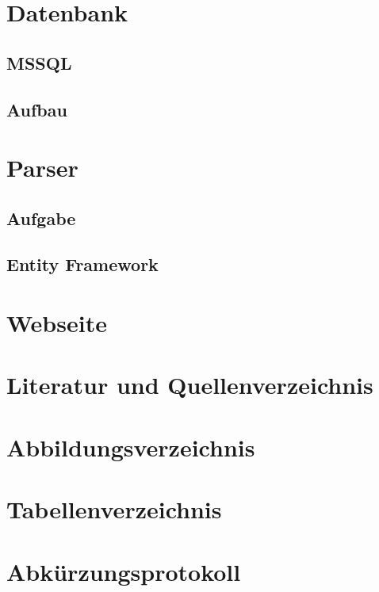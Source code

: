 \documentclass[11pt]{scrartcl}
\begin{document}
\section{Datenbank}
\label{sec:datenbank}
\subsection{MSSQL}
\label{sec:db-mssql}
\subsection{Aufbau}
\label{sec:db-aufbau}

\section{Parser}
\label{sec:parser}
\subsection{Aufgabe}
\label{sec:parser-aufgabe}
\subsection{Entity Framework}
\label{sec:parser-entity-framework}

\section{Webseite}
\label{sec:webseite}

\section{Literatur und Quellenverzeichnis}
\label{sec:literatur-quellenverzeichnis}

\section{Abbildungsverzeichnis}
\label{sec:abbildungsverzeichnis}

\section{Tabellenverzeichnis}
\label{sec:tabellenverzeichnis}

\section{Abkürzungsprotokoll}
\label{sec:abkuerzungsprotokoll}
\end{document}
